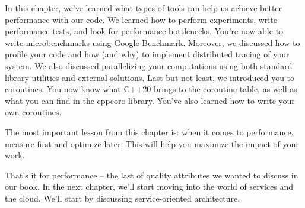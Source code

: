 In this chapter, we've learned what types of tools can help us achieve better performance with our code. We learned how to perform experiments, write performance tests, and look for performance bottlenecks. You're now able to write microbenchmarks using Google Benchmark. Moreover, we discussed how to profile your code and how (and why) to implement distributed tracing of your system. We also discussed parallelizing your computations using both standard library utilities and external solutions. Last but not least, we introduced you to coroutines. You now know what C++20 brings to the coroutine table, as well as what you can find in the cppcoro library. You've also learned how to write your own coroutines.

The most important lesson from this chapter is: when it comes to performance, measure first and optimize later. This will help you maximize the impact of your work.

That's it for performance – the last of quality attributes we wanted to discuss in our book. In the next chapter, we'll start moving into the world of services and the cloud. We'll start by discussing service-oriented architecture.
























